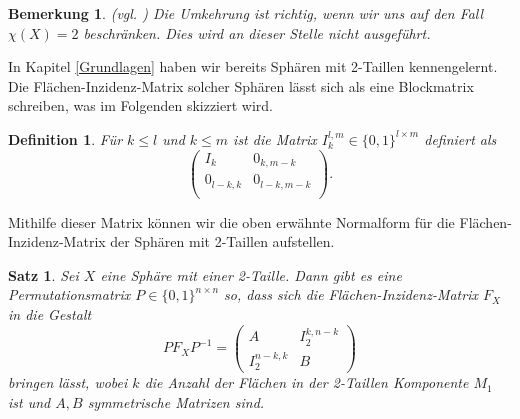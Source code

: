 \documentclass[12pt,titlepage,twoside,cleardoublepage]{article}
\theoremstyle{nummermitklammern}
\newtheorem{definition}[temp]{Definition}
\newtheorem{bemerkung}[temp]{Bemerkung}
\newtheorem{satz}[temp]{Satz}
\newtheorem{definition}[zahl]{Definition}
\newtheorem{bemerkung}[zahl]{Bemerkung}
\newtheorem{satz}[zahl]{Satz}
\numberwithin{equation}{section}
\begin{document}

\begin{bemerkung}{\textsc{(}vgl. \textsc{\cite{simp})}}
Die Umkehrung ist richtig, wenn wir uns auf den Fall $\chi(X)=2$ beschränken.  Dies wird an dieser Stelle nicht ausgeführt. 
\end{bemerkung}
In Kapitel \ref{Grundlagen} haben wir bereits Sphären mit 2-Taillen kennengelernt. Die Flächen-Inzidenz-Matrix solcher Sphären lässt sich als eine Blockmatrix schreiben, was im Folgenden skizziert wird.
\begin{definition}
Für $k\leq l$ und $k\leq m$ ist die Matrix $I^{l,m}_k\in \{0,1\}^{l \times m}$ definiert als
\[
\left( 
\begin{array}{cccc} 
  I_k & 0_{k,m-k} \\
  0_{l-k,k} & 0_{l-k,m-k}\\
\end{array} 
\right).
\]
\end{definition}
Mithilfe dieser Matrix können wir die oben erwähnte Normalform für die Flächen-Inzidenz-Matrix der Sphären mit 2-Taillen aufstellen.
\begin{satz}\label{mat2w}
Sei $X$ eine Sphäre mit einer 2-Taille. Dann gibt es eine Permutationsmatrix $P\in \{0,1\}^{n\times n}$ so, dass sich die Flächen-Inzidenz-Matrix $F_X$ in die Gestalt 
\[
PF_XP^{-1}=
\left( 
\begin{array}{c|c} 
  A & I^{k,n-k}_2 \\ 
  \hline 
  I^{n-k,k}_2 & B 
\end{array} 
\right)
\] 
bringen lässt, wobei $k$ die Anzahl der Flächen in der 2-Taillen Komponente $M_1$ ist und $A,B$ symmetrische Matrizen sind.
\end{satz}
\end{document}
